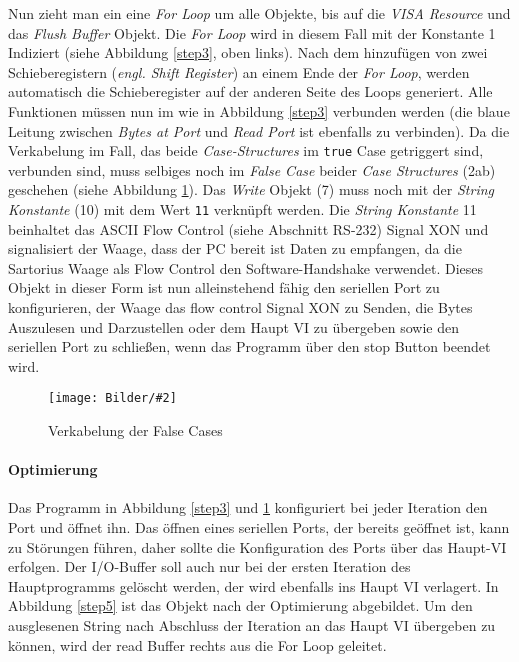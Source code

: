 \documentclass[
fontsize=12pt, 
paper=a4, 
BCOR=10mm, 
twoside=false,
 DIV=10, 
 headsepline, 
 footsepline
 ]{scrartcl}
\def\bild#1#2#3#4#5#6{%
\begin{figure}[h!] %
\centering
\texttt{[image: Bilder/\#2]}
\vspace{#3}
\caption[#4]{#5}\label{#6}
\end{figure}
}
\begin{document}
Nun zieht man ein eine \textit{For Loop} um alle Objekte, bis auf die \textit{VISA Resource} und das \textit{Flush Buffer} Objekt. Die \textit{For Loop} wird in diesem Fall mit der Konstante 1 Indiziert (siehe Abbildung \ref{step3}, oben links). Nach dem hinzufügen von zwei Schieberegistern (\textit{engl. Shift Register}) an einem Ende der \textit{For Loop}, werden automatisch die Schieberegister auf der anderen Seite des Loops generiert. Alle Funktionen müssen nun im wie in Abbildung \ref{step3} verbunden werden (die blaue Leitung zwischen \textit{Bytes at Port} und \textit{Read Port} ist ebenfalls zu verbinden). Da die \glqq Verkabelung\grqq{} im Fall, das beide \textit{Case-Structures} im \texttt{true} Case getriggert sind, verbunden sind, muss selbiges noch im \textit{False Case} beider \textit{Case Structures} (2ab) geschehen (siehe Abbildung \ref{step3b}). Das \textit{Write} Objekt (7) muss noch mit der \textit{String Konstante} (10) mit dem Wert \texttt{11} verknüpft werden. Die \textit{String Konstante} 11 beinhaltet das ASCII Flow Control (siehe Abschnitt RS-232) Signal XON und signalisiert der Waage, dass der PC bereit ist Daten zu empfangen, da die Sartorius Waage als Flow Control den Software-Handshake verwendet. Dieses Objekt in dieser Form ist nun alleinstehend fähig den seriellen Port zu konfigurieren, der Waage das flow control Signal XON zu Senden, die Bytes Auszulesen und Darzustellen oder dem Haupt VI zu übergeben sowie den seriellen Port zu schließen, wenn das Programm über den stop Button beendet wird.

\bild{1}
{LabVIEW_serialport/step_3b_false_cases.png}
{0em}
{\glqq Verkabelung\grqq{} der False Cases}
{\glqq Verkabelung\grqq{} der False Cases}
{step3b}

\paragraph{Optimierung} Das Programm in Abbildung \ref{step3} und \ref{step3b} konfiguriert bei jeder Iteration den Port und öffnet ihn. Das öffnen eines seriellen Ports, der bereits geöffnet ist, kann zu Störungen führen, daher sollte die Konfiguration des Ports über das Haupt-VI erfolgen. Der I/O-Buffer soll auch nur bei der ersten Iteration des Hauptprogramms gelöscht werden, der wird ebenfalls ins Haupt VI verlagert. In Abbildung \ref{step5} ist das Objekt nach der Optimierung abgebildet. Um den ausglesenen String nach Abschluss der Iteration an das Haupt VI übergeben zu können, wird der read Buffer rechts aus die For Loop geleitet. 
\end{document}
